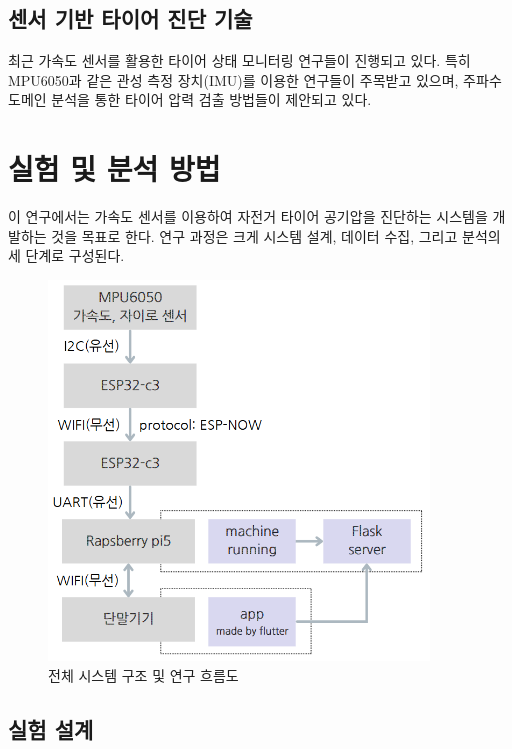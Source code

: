 \documentclass[12pt,a4paper]{article}
\begin{document}
\subsection{센서 기반 타이어 진단 기술}
\label{subsec:sensor_diagnosis}

최근 가속도 센서를 활용한 타이어 상태 모니터링 연구들이 진행되고 있다. 특히 MPU6050과 같은 관성 측정 장치(IMU)를 이용한 연구들이 주목받고 있으며, 주파수 도메인 분석을 통한 타이어 압력 검출 방법들이 제안되고 있다.

\section{실험 및 분석 방법}
\label{sec:methodology}

이 연구에서는 가속도 센서를 이용하여 자전거 타이어 공기압을 진단하는 시스템을 개발하는 것을 목표로 한다. 연구 과정은 크게 시스템 설계, 데이터 수집, 그리고 분석의 세 단계로 구성된다.

\begin{figure}[H]
    \centering
    \includegraphics[width=0.9\textwidth]{images/Flow.png}
    \caption{전체 시스템 구조 및 연구 흐름도}
    \label{fig:overall_flowchart}
\end{figure}

\subsection{실험 설계}
\label{subsec:experimental_design}
\end{document}
